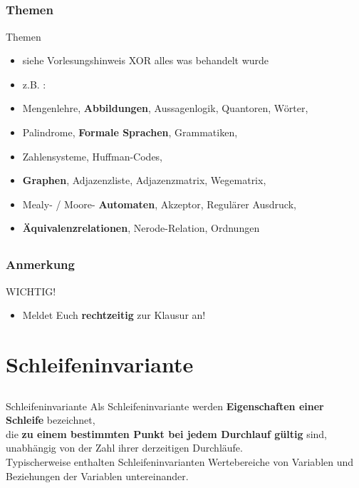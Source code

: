 \subsection*{}
\begin{frame}
  \frametitle{Themen}
	\begin{block}{Themen}

		\begin{itemize}
		\item siehe Vorlesungshinweis XOR alles was behandelt wurde
	  	\item z.B. :\pause
		  	\item Mengenlehre, \textbf{Abbildungen}, Aussagenlogik, Quantoren, Wörter,
		  	\item Palindrome, \textbf{Formale Sprachen}, Grammatiken,
		  	\item Zahlensysteme, Huffman-Codes,
		  	\item \textbf{Graphen}, Adjazenzliste, Adjazenzmatrix, Wegematrix,
		  	\item Mealy- / Moore- \textbf{Automaten}, Akzeptor, Regulärer Ausdruck,
		  	\item \textbf{Äquivalenzrelationen}, Nerode-Relation, Ordnungen
	 	\end{itemize}
	\end{block}
\end{frame}

\subsection*{}
\begin{frame}
   \frametitle{Anmerkung}
	\begin{block}{WICHTIG!}
  	\begin{itemize}
			\item Meldet Euch \textbf{rechtzeitig} zur Klausur an!
		\end{itemize}
	\end{block}

\end{frame}


\section[INV]{Schleifeninvariante}
\subsection*{}
\begin{frame}
	\frametitle{}
	\begin{block}{Schleifeninvariante}
Als Schleifeninvariante werden \textbf{Eigenschaften einer Schleife} bezeichnet, \\
die \textbf{zu einem bestimmten Punkt bei jedem Durchlauf gültig} sind, \\
unabhängig von der Zahl ihrer derzeitigen Durchläufe. \\
Typischerweise enthalten Schleifeninvarianten Wertebereiche von Variablen und Beziehungen der Variablen untereinander.
	\end{block}
\end{frame}

